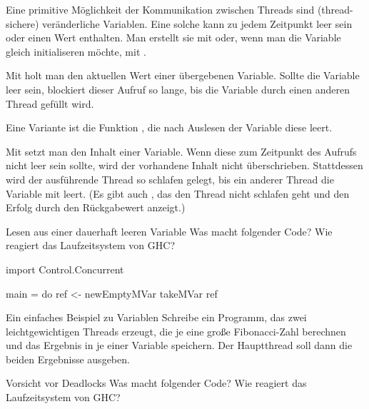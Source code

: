 \documentclass{uebblatt}
\begin{document}
Eine primitive Möglichkeit der Kommunikation zwischen Threads sind
(thread-sichere) veränderliche Variablen. Eine solche kann zu jedem Zeitpunkt
leer sein oder einen Wert enthalten. Man erstellt sie mit
 oder, wenn man die Variable gleich
initialiseren möchte, mit .

Mit  holt man den aktuellen Wert
einer übergebenen Variable. Sollte die Variable leer sein, blockiert dieser
Aufruf so lange, bis die Variable durch einen anderen Thread gefüllt wird.

Eine Variante ist die Funktion , die
nach Auslesen der Variable diese leert.

Mit  setzt man den Inhalt einer
Variable. Wenn diese zum Zeitpunkt des Aufrufs nicht leer sein sollte, wird der
vorhandene Inhalt nicht überschrieben. Stattdessen wird der ausführende Thread
so schlafen gelegt, bis ein anderer Thread die Variable mit
 leert. (Es gibt auch , das den Thread nicht schlafen geht und den Erfolg durch den
Rückgabewert anzeigt.)

\begin{aufgabe}{Lesen aus einer dauerhaft leeren Variable}
Was macht folgender Code? Wie reagiert das Laufzeitsystem von GHC?

\begin{haskellcode}
import Control.Concurrent

main = do
    ref <- newEmptyMVar
    takeMVar ref
\end{haskellcode}
\end{aufgabe}

\begin{aufgabe}{Ein einfaches Beispiel zu Variablen}
Schreibe ein Programm, das zwei leichtgewichtigen Threads erzeugt, die je eine große
Fibonacci-Zahl berechnen und das Ergebnis in je einer Variable speichern. Der
Hauptthread soll dann die beiden Ergebnisse ausgeben.
\end{aufgabe}

\begin{aufgabe}{Vorsicht vor Deadlocks}
Was macht folgender Code? Wie reagiert das Laufzeitsystem von GHC?

\end{aufgabe}
\end{document}
